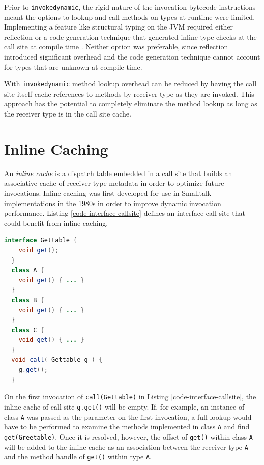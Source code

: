 Prior to \texttt{invokedynamic}, the rigid nature of the invocation bytecode instructions meant the options to lookup and call methods on types at runtime were limited.  Implementing a feature like structural typing on the JVM required either reflection or a code generation technique that generated inline type checks at the call site at compile time \cite{structural-types-scala}.  Neither option was preferable, since reflection introduced significant overhead and the code generation technique cannot account for types that are unknown at compile time.

With \texttt{invokedynamic} method lookup overhead can be reduced by having the call site itself cache references to methods by receiver type as they are invoked.  This approach has the potential to completely eliminate the method lookup as long as the receiver type is in the call site cache.

\section{Inline Caching}

An \emph{inline cache} is a dispatch table embedded in a call site that builds an associative cache of receiver type metadata in order to optimize future invocations.  Inline caching was first developed for use in Smalltalk implementations in the 1980s \cite{smalltalk-pic} in order to improve dynamic invocation performance.  Listing \ref{code-interface-callsite} defines an interface call site that could benefit from inline caching.

\begin{lstlisting}[language=Java,caption=An interface call site,label=code-interface-callsite]
  interface Gettable {
    void get();
  }
  class A {
    void get() { ... }
  }
  class B {
    void get() { ... }
  }
  class C {
    void get() { ... }
  }
  void call( Gettable g ) {
    g.get();
  }
\end{lstlisting}

On the first invocation of \texttt{call(Gettable)} in Listing \ref{code-interface-callsite}, the inline cache of call site \texttt{g.get()} will be empty.  If, for example, an instance of class \texttt{A} was passed as the parameter on the first invocation, a full lookup would have to be performed to examine the methods implemented in class \texttt{A} and find \texttt{get(Greetable)}.  Once it is resolved, however, the offset of \texttt{get()} within class \texttt{A} will be added to the inline cache as an association between the receiver type \texttt{A} and the method handle of \texttt{get()} within type \texttt{A}.


